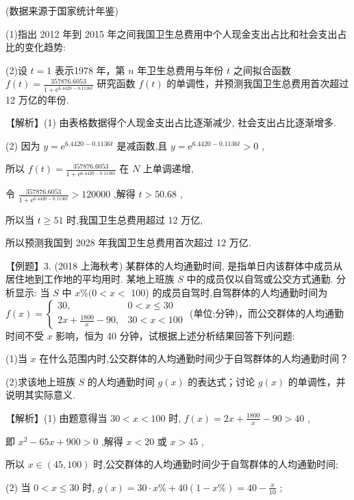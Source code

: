 \documentclass[10pt]{article}
\begin{document}
(数据来源于国家统计年鉴)

(1)指出 2012 年到 2015 年之间我国卫生总费用中个人现金支出占比和社会支出占比的变化趋势:

(2)设 \(t = 1\) 表示1978 年，第 \(n\) 年卫生总费用与年份 \(t\) 之间拟合函数 \(f\left( t\right)  = \frac{357876.6053}{1 + {\mathrm{e}}^{{6.4420} - {0.1136t}}}\) 研究函数 \(f\left( t\right)\) 的单调性，并预测我国卫生总费用首次超过 12 万亿的年份.

【解析】(1) 由表格数据得个人现金支出占比逐渐减少, 社会支出占比逐渐增多.

(2) 因为 \(y = {\mathrm{e}}^{{6.4420} - {0.1136t}}\) 是减函数,且 \(y = {\mathrm{e}}^{{6.4420} - {0.1136t}} > 0\) ,

所以 \(f\left( t\right)  = \frac{357876.6053}{1 + {\mathrm{e}}^{{6.4420} - {0.1136t}}}\) 在 \(N\) 上单调递增,

令 \(\frac{357876.6053}{1 + {\mathrm{e}}^{{6.4420} - {0.1136t}}} > {120000}\) ,解得 \(t > {50.68}\) ,

所以当 \(t \geq  {51}\) 时,我国卫生总费用超过 12 万亿,

所以预测我国到 2028 年我国卫生总费用首次超过 12 万亿.

【例题】3. (2018 上海秋考) 某群体的人均通勤时间, 是指单日内该群体中成员从居住地到工作地的平均用时. 某地上班族 \(S\) 中的成员仅以自驾或公交方式通勤. 分析显示: 当 \(S\) 中 \(x\% (0 < x <\) 100) 的成员自驾时,自驾群体的人均通勤时间为 \(f\left( x\right)  = \left\{  \begin{array}{ll} {30}, & 0 < x \leq  {30} \\  {2x} + \frac{1800}{x} - {90}, & {30} < x < {100} \end{array}\right.\) (单位:分钟)，而公交群体的人均通勤时间不受 \(x\) 影响，恒为 40 分钟，试根据上述分析结果回答下列问题:

(1)当 \(x\) 在什么范围内时,公交群体的人均通勤时间少于自驾群体的人均通勤时间？

(2)求该地上班族 \(S\) 的人均通勤时间 \(g\left( x\right)\) 的表达式；讨论 \(g\left( x\right)\) 的单调性，并说明其实际意义.

【解析】(1) 由题意得当 \({30} < x < {100}\) 时, \(f\left( x\right)  = {2x} + \frac{1800}{x} - {90} > {40}\) ,

即 \({x}^{2} - {65x} + {900} > 0\) ,解得 \(x < {20}\) 或 \(x > {45}\) ,

所以 \(x \in  \left( {{45},{100}}\right)\) 时,公交群体的人均通勤时间少于自驾群体的人均通勤时间;

(2) 当 \(0 < x \leq  {30}\) 时, \(g\left( x\right)  = {30} \cdot  x\%  + {40}\left( {1 - x\% }\right)  = {40} - \frac{x}{10}\) ;
\end{document}

